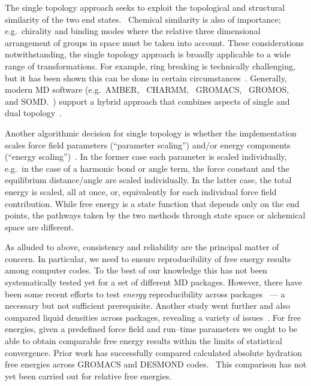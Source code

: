 \documentclass[journal=jctcce,manuscript=article]{achemso}
\begin{document}
The single topology approach seeks to exploit the
topological and structural similarity of the two end states.~\cite{doi:10.1021/j100056a020}
Chemical similarity is also of
importance; e.g.\ chirality and binding modes where the relative three
dimensional arrangement of groups in space must be taken into account.
These considerations notwithstanding, the single topology approach is broadly applicable to a wide range of transformations.
For example, ring breaking is technically
challenging,~\cite{doi:10.1021/acs.jctc.6b00991} but it has been
shown this can be done in certain
circumstances~\cite{doi:10.1021/acs.jcim.5b00057,
  doi:10.1021/jp994193s}.
Generally, modern MD software (e.g.\ AMBER,~\cite{case_amber_2005}
CHARMM,~\cite{JCC:JCC21287} GROMACS,~\cite{Abraham201519}
GROMOS,~\cite{doi:10.1021/jp984217f} and SOMD.~\cite{Sire-2016,
  doi:10.1021/ct300857j}) support a hybrid approach that combines aspects of single and dual topology~\cite{doi:10.1021/jp994193s}.

Another algorithmic decision for single topology is whether  the implementation scales force field parameters (``parameter
scaling'') and/or energy components (``energy
scaling'')~\cite{doi:10.1021/jp981628n}.  In the former case each parameter is
scaled individually, e.g.\ in the case of a harmonic bond or angle term,
the force constant and the equilibrium distance/angle are scaled
individually.  In the
latter case, the total energy is scaled, all at once, or, equivalently for each
individual force field contribution.  While free energy is a state function that
depends only on the end points, the pathways taken by the
two methods through state space or alchemical space are different.


As alluded to above, consistency and reliability are the principal matter of concern.
In particular, we need to ensure reproducibility of free energy results
among computer codes.  To the best of our knowledge this has not been
systematically tested yet for a set of different MD packages.
However, there have been some recent efforts to test \emph{energy}
reproducibility across packages~\cite{Shirts2017} --- a necessary but not
sufficient prerequisite.  Another study went further and also compared liquid
densities across packages, revealing a variety of
issues~\cite{doi:10.1021/acs.jctc.7b00489}. 
For free energies, given a predefined force field and run--time
parameters we ought to be able to obtain comparable free energy
results within the limits of statistical convergence.  Prior work has
successfully compared calculated absolute hydration free energies
across GROMACS and DESMOND codes.~\cite{klimovich_predicting_2010}
This comparison has not yet been carried out for relative free energies.
\end{document}
